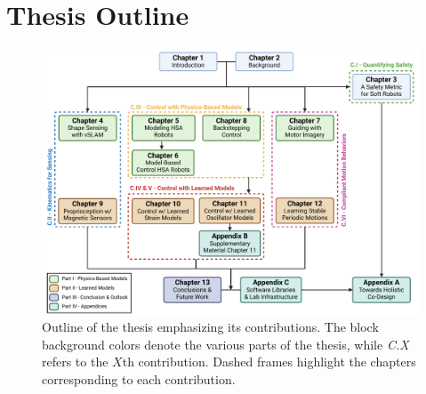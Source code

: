 \section{Thesis Outline}\label{sec:introduction:outline}

\begin{figure}[ht]
    \centering
    \includegraphics[width=1.0\linewidth]{introduction/figures/thesis_outline_tree_v2.pdf}
    \caption{
    Outline of the thesis emphasizing its contributions. The block background colors denote the various parts of the thesis, while \emph{C.X} refers to the $X$th contribution. Dashed frames highlight the chapters corresponding to each contribution.
    }
    \label{fig:introduction:thesis_outline_tree}
\end{figure}

